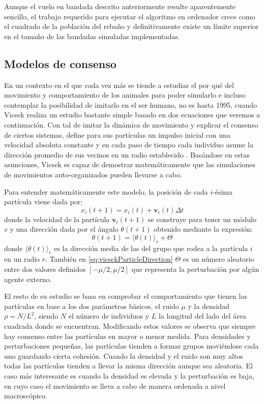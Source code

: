 Aunque el vuelo en bandada descrito anteriormente resulte aparentemente sencillo, el trabajo requerido para ejecutar el algoritmo en ordenador crece como el cuadrado de la población del rebaño y definitivamente existe un límite superior en el tamaño de las bandadas simuladas implementadas.

\subsection{Modelos de consenso}\label{s2_2_4}

En un contexto en el que cada vez más se tiende a estudiar el por qué del movimiento y comportamiento de los animales para poder simularlo e incluso contemplar la posibilidad de imitarlo en el ser humano, no es hasta 1995, cuando Vicsek realiza un estudio bastante simple basado en dos ecuaciones que veremos a continuación. Con tal de imitar la dinámica de movimiento y explicar el consenso de ciertos sistemas, define para sus partículas un impulso inicial con una velocidad absoluta constante y en cada paso de tiempo cada individuo asume la dirección promedio de sus vecinos en un radio establecido \cite{vicsek1995novel}. Basándose en estas asunciones, Vicsek es capaz de demostrar matemáticamente que las simulaciones de movimientos auto-organizados pueden llevarse a cabo.

Para entender matemáticamente este modelo, la posición de cada \(i\)-ésima partícula viene dada por:
\begin{equation}\label{eq:vicsekParticlePosition}
    x_{i}(t+1)=x_{i}(t)+\mathbf{v}_{i}(t)\Delta t
\end{equation}
 donde la velocidad de la partícula $\mathbf{v}_{i}(t+1)$ se construye para tener un módulo $v$ y una dirección dada por el ángulo $\theta (t+1)$ obtenido mediante la expresión: 
 \begin{equation}\label{eq:vicsekParticleDirection}
    \theta (t+1)=\langle\theta (t)\rangle _{r}+\Theta
 \end{equation}
 donde $\langle \theta (t)\rangle _{r}$ es la dirección media de las del grupo que rodea a la partícula $i$ en un radio $r$. También en \ref{eq:vicsekParticleDirection} $\Theta$ es un número aleatorio entre dos valores definidos $[-\mu /2 , \mu /2]$ que representa la perturbación por algún agente externo. 
 
 El resto de su estudio se basa en comprobar el comportamiento que tienen las partículas en base a los dos parámetros básicos, el ruido $\mu$ y la densidad $\rho = N/L^{2}$, siendo $N$ el número de individuos y $L$ la longitud del lado del área cuadrada donde se encuentran. Modificando estos valores se observa que siempre hay consenso entre las partículas en mayor o menor medida. Para densidades y perturbaciones pequeñas, las partículas tienden a formar grupos moviéndose cada uno guardando cierta cohesión. Cuando la densidad y el ruido son muy altos todas las partículas tienden a llevar la misma dirección aunque sea aleatoria. El caso más interesante es cuando la densidad es elevada y la perturbación es baja, en cuyo caso el movimiento se lleva a cabo de manera ordenada a nivel macroscópico. 
 
